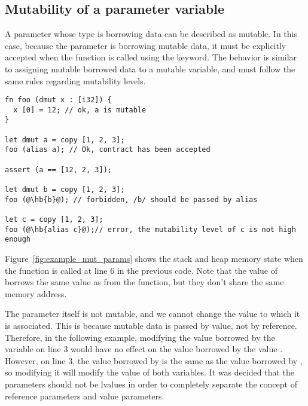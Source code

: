 
\subsection{Mutability of a parameter variable}

A parameter whose type is borrowing data can be described as mutable. In this
case, because the parameter is borrowing mutable data, it must be explicitly
accepted when the function is called using the  keyword. The
behavior is similar to assigning mutable borrowed data to a mutable variable,
and must follow the same rules regarding mutability levels.

\begin{lstlisting}[style=coloredverbatim, escapechar=@]
fn foo (dmut x : [i32]) {
  x [0] = 12; // ok, a is mutable
}

let dmut a = copy [1, 2, 3];
foo (alias a); // Ok, contract has been accepted

assert (a == [12, 2, 3]);

let dmut b = copy [1, 2, 3];
foo (@\hb{b}@); // forbidden, /b/ should be passed by alias

let c = copy [1, 2, 3];
foo (@\hb{alias c}@);// error, the mutability level of c is not high enough
\end{lstlisting}

Figure~\ref{fig:example_mut_params} shows the stack and heap memory state when
the  function is called at line 6 in the previous code. Note that
the value of  borrows the same value as  from the
 function, but they don't share the same memory address.



The parameter itself is not mutable, and we cannot change the value to which it
is associated. This is because mutable data is passed by value, not by
reference. Therefore, in the following example, modifying the value borrowed by
the variable  on line 3 would have no effect on the value borrowed by
the value . However, on line 3, the value borrowed by  is the
same as the value borrowed by , so modifying it will modify the value
of both variables. It was decided that the parameters should not be lvalues in
order to completely separate the concept of reference parameters and value
parameters.

